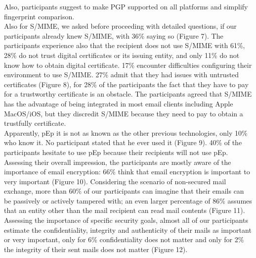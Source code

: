 Also, participants suggest to make PGP supported on all platforms and simplify fingerprint comparison.\\
Also for S/MIME, we asked before proceeding with detailed questions, if our participants already knew S/MIME, with 36\% saying so (Figure 7).
The participants experience also that the recipient does not use S/MIME with 61\%, 28\% do not trust digital certificates or its issuing entity, and only 11\% do not know how to obtain digital certificate. 17\% encounter difficulties configuring their environment to use S/MIME. 27\% admit that they had issues with untrusted certificates (Figure 8), for 28\% of the participants the fact that they have to pay for a trustworthy certificate is an obstacle.
The participants agreed that S/MIME has the advantage of being integrated in most email clients including Apple MacOS/iOS, but they discredit S/MIME because they need to pay to obtain a trustfully certificate.\\
Apparently, pEp it is not as known as the other previous technologies, only 10\% who know it. No participant stated that he ever used it (Figure 9).
40\% of the participants hesitate to use pEp because their recipients will not use pEp.\\
Assessing their overall impression, the participants are mostly aware of the importance of email encryption: 66\% think that email encryption is important to very important (Figure 10).
Considering the scenario of non-secured mail exchange, more than 60\% of our participants can imagine that their emails can be passively or actively tampered with; an even larger percentage of 86\% assumes that an entity other than the mail recipient can read mail contents (Figure 11).
Assessing the importance of specific security goals, almost all of our participants estimate the confidentiality, integrity and authenticity of their mails as important or very important, only for 6\% confidentiality does not matter and only for 2\% the integrity of their sent mails does not matter (Figure 12).
